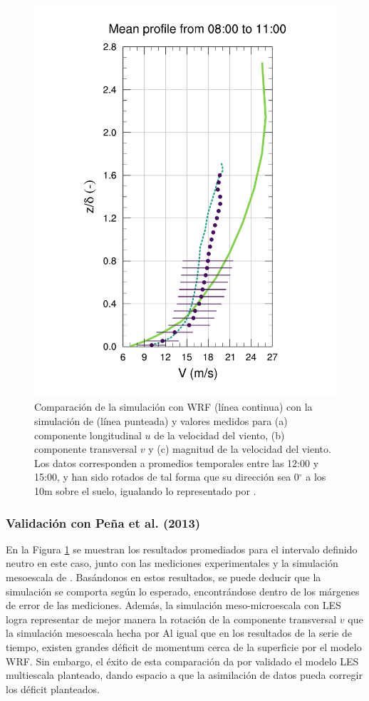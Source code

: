 \begin{figure}[H]
\begin{center}
	\includegraphics[height=0.62\linewidth,page=37,trim={48mm 10mm 41mm 25mm},clip]{Imagenes/06/hov/9V}%
	\end{center}
	\caption{Comparación de la simulación con WRF (línea continua) con la simulación de \cite{Pea2013} (línea punteada) y valores medidos para (a) componente longitudinal $u$ de la velocidad del viento, (b) componente transversal $v$ y (c) magnitud de la velocidad del viento. Los datos corresponden a promedios temporales entre las 12:00 y 15:00, y han sido rotados de tal forma que su dirección sea 0$^\circ$ a los 10m sobre el suelo, igualando lo representado por \cite{Pea2013}.}
	\label{fig:06_hov_peña}
\end{figure}

\subsubsection{Validación con Peña et al. (2013)}
En la Figura \ref{fig:06_hov_peña} se muestran los resultados promediados para el intervalo definido neutro en este caso, junto con las mediciones experimentales y la simulación mesoescala de \cite{Pea2013}. Basándonos en estos resultados, se puede deducir que la simulación se comporta según lo esperado, encontrándose dentro de los márgenes de error de las mediciones. Además, la simulación meso-microescala con LES logra representar de mejor manera la rotación de la componente transversal $v$ que la simulación mesoescala hecha por \cite{Pea2013} Al igual que en los resultados de la serie de tiempo, existen grandes déficit de momentum cerca de la superficie por el modelo WRF. Sin embargo, el éxito de esta comparación da por validado el modelo LES multiescala planteado, dando espacio a que la asimilación de datos pueda corregir los déficit planteados.
